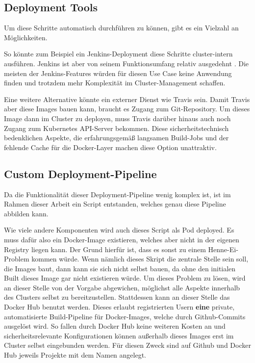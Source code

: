 \subsection{Deployment Tools}

Um diese Schritte automatisch durchführen zu können, gibt es ein Vielzahl an
Möglichkeiten.

So könnte zum Beispiel ein Jenkins-Deployment diese Schritte cluster-intern
ausführen. Jenkins ist aber von seinem Funktionsumfang relativ ausgedehnt
\cite{continte}.
Die meisten der Jenkins-Features würden für diesen Use Case keine Anwendung
finden und trotzdem mehr Komplexität im Cluster-Management schaffen.

Eine weitere Alternative könnte ein externer Dienst wie Travis sein. Damit
Travis
aber diese Images bauen kann, braucht es Zugang zum Git-Repository. Um
dieses Image
dann im Cluster zu deployen, muss Travis darüber hinaus auch noch Zugang
zum Kubernetes
API-Server bekommen. Diese sicherheitstechnisch bedenklichen
Aspekte, die
erfahrungsgemäß langsamen Build-Jobs und der fehlende Cache für
die Docker-Layer
machen diese Option unattraktiv.

\subsection{Custom Deployment-Pipeline}

Da die Funktionalität dieser Deployment-Pipeline wenig komplex ist, ist im Rahmen
dieser Arbeit ein Script entstanden, welches genau diese Pipeline abbilden kann.

Wie viele andere Komponenten wird auch dieses Script als Pod deployed. Es muss
dafür also ein Docker-Image existieren, welches aber nicht in der eigenen
Registry liegen kann.
Der Grund hierfür ist, dass es sonst zu einem Henne-Ei-Problem kommen würde.
Wenn nämlich dieses Skript die zentrale Stelle sein soll, die Images baut, dann
kann sie sich nicht selbst bauen, da ohne den initialen Built dieses
Image gar nicht
existieren würde.
Um dieses Problem zu lösen, wird an dieser Stelle von der Vorgabe
abgewichen,
möglichst alle Aspekte innerhalb des Clusters selbst zu bereitzustellen.
Stattdessen kann an dieser Stelle das Docker Hub benutzt werden. Dieses erlaubt
registrierten Usern \textbf{eine} private, automatisierte Build-Pipeline
für Docker-Images, welche durch
Github-Commits ausgelöst wird.
So fallen durch Docker Hub keine weiteren Kosten an und sicherheitsrelevante
Konfigurationen können außerhalb dieses Images erst im Cluster selbst
eingebunden werden.
Für diesen Zweck sind auf Github und Docker Hub jeweils Projekte mit dem
Namen  angelegt.


